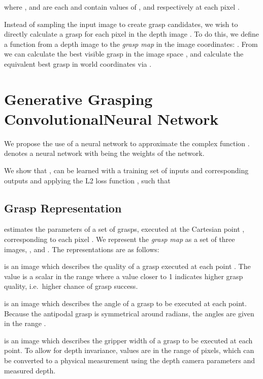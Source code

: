 \documentclass[conference]{IEEEtran}
\begin{document}
where ,  and  are each  and contain values of ,  and  respectively at each pixel .

Instead of sampling the input image to create grasp candidates, we wish to directly calculate a grasp  for each pixel in the depth image .  To do this, we define a function  from a depth image to the \textit{grasp map} in the image coordinates: .  From  we can calculate the best visible grasp in the image space , and calculate the equivalent best grasp in world coordinates  via . 


\section{Generative Grasping Convolutional\newline Neural Network}

We propose the use of a neural network to approximate the complex function .
 denotes a neural network with  being the weights of the network.

We show that , can be learned with a training set of inputs  and corresponding outputs  and applying the L2 loss function , such that 



\subsection{Grasp Representation}
 estimates the parameters of a set of grasps, executed at the Cartesian point , corresponding to each pixel .
We represent the \textit{grasp map}  as a set of three images, ,  and . 
The representations are as follows:

 is an image which describes the quality of a grasp executed at each point .  The value is a scalar in the range  where a value closer to 1 indicates higher grasp quality, i.e.\ higher chance of grasp success.

 is an image which describes the angle of a grasp to be executed at each point.  Because the antipodal grasp is symmetrical around  radians, the angles are given in the range .

\vspace{1mm}  is an image which describes the gripper width of a grasp to be executed at each point.  To allow for depth invariance, values are in the range of  pixels, which can be converted to a physical measurement using the depth camera parameters and measured depth.
\end{document}

